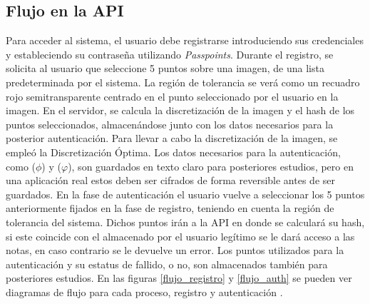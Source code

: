 \subsection{Flujo en la API}
Para acceder al sistema, el usuario debe registrarse introduciendo sus credenciales y estableciendo su contraseña utilizando \textit{Passpoints}. Durante el registro, se solicita al usuario que seleccione 5 puntos sobre una imagen, de una lista predeterminada por el sistema. La regi\'on de tolerancia se ver\'a como un recuadro rojo semitransparente centrado en el punto seleccionado por el usuario en la imagen. En el servidor, se calcula la discretización de la imagen y el hash de los puntos seleccionados, almacenándose junto con los datos necesarios para la posterior autenticación. Para llevar a cabo la discretización de la imagen, se empleó la Discretización Óptima. Los datos necesarios para la autenticación, como  ($\phi$) y ($\varphi$), son guardados en texto claro para posteriores estudios, pero en una aplicaci\'on real estos deben ser cifrados de forma reversible antes de ser guardados. En la fase de autenticaci\'on el usuario vuelve a seleccionar los 5 puntos anteriormente fijados en la fase de registro, teniendo en cuenta la regi\'on de tolerancia del sistema. Dichos puntos ir\'an a la API en donde se calcular\'a su hash, si este coincide con el almacenado por el usuario leg\'itimo se le dar\'a acceso a las notas, en caso contrario se le devuelve un error. Los puntos utilizados para la autenticaci\'on y su estatus de fallido, o no, son almacenados tambi\'en para posteriores estudios. En las figuras \ref{flujo_registro} y \ref{flujo_auth} se pueden ver diagramas de flujo para cada proceso, registro y  autenticaci\'on .

